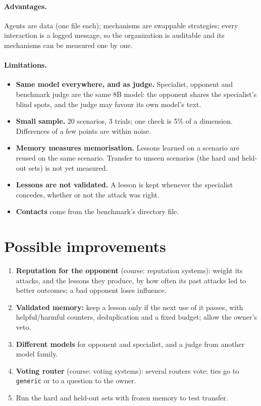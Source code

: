 \documentclass[11pt,a4paper]{article}
\newcommand{\code}[1]{\texttt{#1}}
\begin{document}
\paragraph{Advantages.} Agents are data (one file each); mechanisms are swappable strategies; every interaction is
a logged message, so the organization is auditable and its mechanisms can be measured one by one.

\paragraph{Limitations.}
\begin{itemize}
  \item \textbf{Same model everywhere, and as judge.} Specialist, opponent and benchmark judge are the same 8B model:
        the opponent shares the specialist's blind spots, and the judge may favour its own model's text.
  \item \textbf{Small sample.} 20 scenarios, 3 trials; one check is 5\% of a dimension. Differences of a few points
        are within noise.
  \item \textbf{Memory measures memorisation.} Lessons learned on a scenario are reused on the same scenario.
        Transfer to unseen scenarios (the hard and held-out sets) is not yet measured.
  \item \textbf{Lessons are not validated.} A lesson is kept whenever the specialist concedes, whether or not the
        attack was right.
  \item \textbf{Contacts} come from the benchmark's directory file.
\end{itemize}

\section{Possible improvements}
\begin{enumerate}
  \item \textbf{Reputation for the opponent} (course: reputation systems): weight its attacks, and the lessons they
        produce, by how often its past attacks led to better outcomes; a bad opponent loses influence.
  \item \textbf{Validated memory:} keep a lesson only if the next use of it passes, with helpful/harmful counters,
        deduplication and a fixed budget; allow the owner's veto.
  \item \textbf{Different models} for opponent and specialist, and a judge from another model family.
  \item \textbf{Voting router} (course: voting systems): several routers vote; ties go to \code{generic} or to a
        question to the owner.
  \item Run the hard and held-out sets with frozen memory to test transfer.
\end{enumerate}
\end{document}
